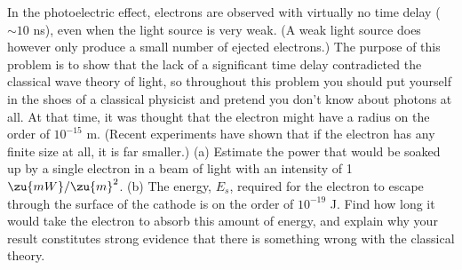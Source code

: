 In the photoelectric effect, electrons are observed with
virtually no time delay ($\sim10$ ns), even when the light
source is very weak. (A weak light source does however only
produce a small number of ejected electrons.) The purpose of
this problem is to show that the lack of a significant time
delay contradicted the classical wave theory of light, so
throughout this problem you should put yourself in the shoes
of a classical physicist and pretend you don't know about
photons at all. At that time, it was thought that the
electron might have a radius on the order of $10^{-15}$ m. 
(Recent experiments have shown that if the electron has any
finite size at all, it is far smaller.)\hwendpart
(a) Estimate the power that would be soaked up by a single
electron in a beam of light with an intensity of 1 $\zu{mW}/\zu{m}^2$.\answercheck\hwendpart
(b) The energy, $E_s$, required for the electron to escape
through the surface of the cathode is on the order of 
$10^{-19}$ J. Find how long it would take the electron to
absorb this amount of energy, and explain why your result
constitutes strong evidence that there is something wrong
with the classical theory.\answercheck
